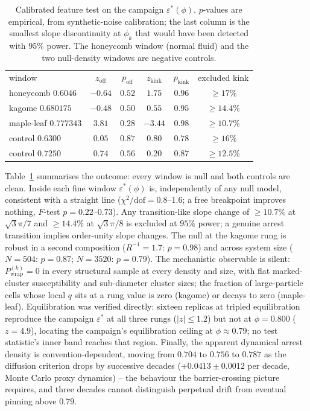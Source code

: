 \documentclass[aps,prl,twocolumn,superscriptaddress,floatfix]{revtex4-2}
\begin{document}
\begin{table}[t]
\caption{Calibrated feature test on the campaign $\varepsilon^*(\phi)$.
$p$-values are empirical, from synthetic-noise calibration; the last column
is the smallest slope discontinuity at $\phi_k$ that would have been
detected with $95\%$ power. The honeycomb window (normal fluid) and the two
null-density windows are negative controls.}
\label{tab:retest}
\begin{ruledtabular}
\begin{tabular}{lccccc}
window & $z_{\mathrm{off}}$ & $p_{\mathrm{off}}$ & $z_{\mathrm{kink}}$ &
$p_{\mathrm{kink}}$ & excluded kink\\
\colrule
honeycomb $0.6046$ & $-0.64$ & $0.52$ & $1.75$ & $0.96$ & $\geq17\%$\\
kagome $0.680175$ & $-0.48$ & $0.50$ & $0.55$ & $0.95$ & $\geq14.4\%$\\
maple-leaf $0.777343$ & $3.81$ & $0.28$ & $-3.44$ & $0.98$ & $\geq10.7\%$\\
control $0.6300$ & $0.05$ & $0.87$ & $0.80$ & $0.78$ & $\geq16\%$\\
control $0.7250$ & $0.74$ & $0.56$ & $0.20$ & $0.87$ & $\geq12.5\%$\\
\end{tabular}
\end{ruledtabular}
\end{table}

Table~\ref{tab:retest} summarises the outcome: every window is null and both
controls are clean. Inside each fine window $\varepsilon^*(\phi)$ is,
independently of any null model, consistent with a straight line
($\chi^2/\mathrm{dof}=0.8$--$1.6$; a free breakpoint improves nothing,
$F$-test $p=0.22$--$0.73$). Any transition-like slope change of
$\geq10.7\%$ at $\sqrt{3}\pi/7$ and $\geq14.4\%$ at $\sqrt{3}\pi/8$ is
excluded at $95\%$ power; a genuine arrest transition implies order-unity
slope changes. The null at the kagome rung is robust in a second
composition ($R^{-1}=1.7$: $p=0.98$) and across system size
($N=504$: $p=0.87$; $N=3520$: $p=0.79$). The mechanistic observable is
silent: $P^{(k)}_{\mathrm{wrap}}=0$ in every structural sample at every
density and size, with flat marked-cluster susceptibility and
sub-diameter cluster sizes; the fraction of large-particle cells whose
local $q$ sits at a rung value is zero (kagome) or decays to zero
(maple-leaf). Equilibration was verified directly: sixteen replicas at
tripled equilibration reproduce the campaign $\varepsilon^*$ at all three
rungs ($|z|\leq1.2$) but not at $\phi=0.800$ ($z=4.9$), locating the
campaign's equilibration ceiling at $\phi\approx0.79$; no test statistic's
inner band reaches that region. Finally, the apparent dynamical arrest
density is convention-dependent, moving from $0.704$ to $0.756$ to
$0.787$ as the diffusion criterion drops by successive decades
($+0.0413\pm0.0012$ per decade, Monte Carlo proxy dynamics) -- the
behaviour the barrier-crossing picture requires, and three decades cannot
distinguish perpetual drift from eventual pinning above $0.79$.
\end{document}
